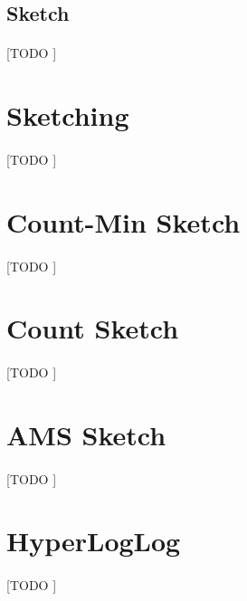 \documentclass{subfiles}
\begin{document}
      \subsection{Sketch}
      \label{sec:sketch}

        \paragraph{}
        [TODO ]

    \section{Sketching}
    \label{sec:sketching}

      \paragraph{}
      [TODO ]

    \section{Count-Min Sketch}
    \label{sec:count_min_sketch}

      \paragraph{}
      [TODO ]

    \section{Count Sketch}
    \label{sec:count_sketch}

      \paragraph{}
      [TODO ]

    \section{AMS Sketch}
    \label{sec:ams_sketch}

      \paragraph{}
      [TODO ]

    \section{HyperLogLog}
    \label{sec:hyper_log_log}

      \paragraph{}
      [TODO ]
\end{document}
